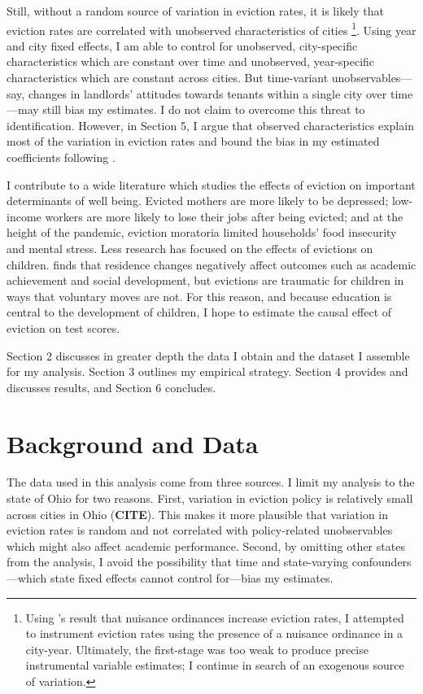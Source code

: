\documentclass[12pt]{article}
\begin{document}
Still, without a random source of variation in eviction rates, it is likely that eviction rates are correlated with unobserved characteristics of cities \footnote{Using \cite{kroeger_nuisance_2020}'s result that nuisance ordinances increase eviction rates, I attempted to instrument eviction rates using the presence of a nuisance ordinance in a city-year. Ultimately, the first-stage was too weak to produce precise instrumental variable estimates; I continue in search of an exogenous source of variation.}. Using year and city fixed effects, I am able to control for unobserved, city-specific characteristics which are constant over time and unobserved, year-specific characteristics which are constant across cities. But time-variant unobservables—say, changes in landlords' attitudes towards tenants within a single city over time—may still bias my estimates. I do not claim to overcome this threat to identification. However, in Section 5, I argue that observed characteristics explain most of the variation in eviction rates and bound the bias in my estimated coefficients following \cite{oster_unobservable_2019}.

I contribute to a wide literature which studies the effects of eviction on important determinants of well being. Evicted mothers are more likely to be depressed; low-income workers are more likely to lose their jobs after being evicted; and at the height of the pandemic, eviction moratoria limited households’ food insecurity and mental stress\citep{desmond_housing_2016, desmond_evictions_2015, an_covid-19_2021}. Less research has focused on the effects of evictions on children. \cite{grigg_school_2012} finds that residence changes negatively affect outcomes such as academic achievement and social development, but evictions are traumatic for children in ways that voluntary moves are not. For this reason, and because education is central to the development of children, I hope to estimate the causal effect of eviction on test scores.

Section 2 discusses in greater depth the data I obtain and the dataset I assemble for my analysis. Section 3 outlines my empirical strategy. Section 4 provides and discusses results, and Section 6 concludes.
















\section{Background and Data} \label{sec:data}
The data used in this analysis come from three sources. I limit my analysis to the state of Ohio for two reasons. First, variation in eviction policy is relatively small across cities in Ohio (\textbf{CITE}). This makes it more plausible that variation in eviction rates is random and not correlated with policy-related unobservables which might also affect academic performance. Second, by omitting other states from the analysis, I avoid the possibility that time and state-varying confounders—which state fixed effects cannot control for—bias my estimates.
\end{document}
